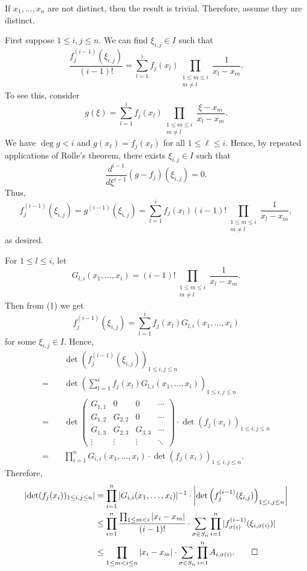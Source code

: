 \documentclass{Vorlesungstemplate_English} %
\begin{document}
\begin{pf}
  If $x_1, \dots, x_n$ are not distinct, then the result is trivial. Therefore, assume they are distinct.

  First suppose $1 \leq i,j \leq n$. We can find $\xi_{i,j} \in I$ such that
  \begin{equation}\label{eq:3.4_divided_difference}
    \frac{f_j^{(i-1)}(\xi_{i,j})}{(i-1)!}
    = \sum_{l=1}^i f_j(x_l)\prod_{\substack{1 \leq m \leq i \\ m \neq l}}\frac{1}{x_l-x_m}.
    \tag{1}
  \end{equation}
  To see this, consider
  \[ g(\xi) = \sum_{l=1}^i f_j(x_l)\prod_{\substack{1 \leq m \leq i \\ m \neq l}}\frac{\xi-x_m}{x_l-x_m}.\]
  We have $\deg g<i$ and $g(x_\ell)=f_j(x_\ell)$ for all $1 \leq \ell \leq i$. Hence, by repeated applications of Rolle's theorem, there exists $\xi_{i,j} \in I$ such that
  \[ \frac{d^{i-1}}{d\xi^{i-1}}(g-f_j)(\xi_{i,j}) = 0.\]
  Thus,
  \[ f_j^{(i-1)}(\xi_{i,j}) = g^{(i-1)}(\xi_{i,j}) = \sum_{l=1}^i f_j(x_l)(i-1)!\prod_{\substack{1 \leq m \leq i \\ m \neq l}}\frac{1}{x_l-x_m},\]
  as desired.

  For $1 \leq l \leq i$, let
  \[ G_{l,i}(x_1,\dots,x_i) = (i-1)!\prod_{\substack{1 \leq m \leq i \\ m \neq l}}\frac{1}{x_l-x_m}.\]
  Then from (1) we get
  \[ f_j^{(i-1)}(\xi_{i,j}) = \sum_{l=1}^i f_j(x_l)G_{l,i}(x_1,\dots,x_i)\]
  for some $\xi_{i,j}\in I$. Hence,
  \begin{align*}
    &\det\left(f_j^{(i-1)}(\xi_{i,j})\right)_{1 \leq i,j \leq n} \\
    =\quad & \det\left(\sum_{l=1}^i f_j(x_l)G_{l,i}(x_1,\dots,x_i)\right)_{1 \leq i,j \leq n} \\
    =\quad & \det\begin{pmatrix}
      G_{1,1} & 0 & 0 & \cdots \\
      G_{1,2} & G_{2,2} & 0 & \cdots \\
      G_{1,3} & G_{2,3} & G_{3,3} & \cdots \\
      \vdots & \vdots & \vdots & \ddots
    \end{pmatrix}
    \cdot \det(f_j(x_i))_{1 \leq i,j \leq n} \\
    =\quad & \prod_{i=1}^n G_{i,i}(x_1,\dots,x_i)\cdot \det(f_j(x_i))_{1 \leq i,j \leq n}.
  \end{align*}
  Therefore,
  \begin{align*}
    \left|\det(f_j(x_i))_{1 \leq i,j \leq n}\right|
    &= \prod_{i=1}^n |G_{i,i}(x_1,\dots,x_i)|^{-1}\cdot \left|\det\left(f_j^{(i-1)}(\xi_{i,j})\right)_{1 \leq i,j \leq n}\right| \\
    &\leq \prod_{i=1}^n \frac{\prod_{1 \leq m < i}|x_i-x_m|}{(i-1)!}\cdot \sum_{\sigma \in S_n}\prod_{i=1}^n |f_{\sigma(i)}^{(i-1)}(\xi_{i,\sigma(i)})| \\
    &\leq \prod_{1 \leq m < i \leq n}|x_i-x_m|\cdot \sum_{\sigma \in S_n}\prod_{i=1}^n A_{i,\sigma(i)}. \qedhere
  \end{align*}
\end{pf}
\end{document}
